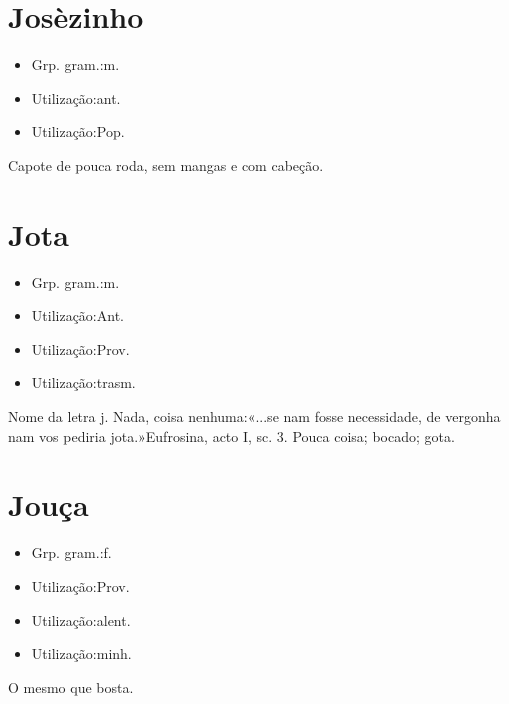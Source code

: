 \documentclass{article}
\begin{document}
\section{Josèzinho}
\begin{itemize}
\item {Grp. gram.:m.}
\end{itemize}
\begin{itemize}
\item {Utilização:ant.}
\end{itemize}
\begin{itemize}
\item {Utilização:Pop.}
\end{itemize}
Capote de pouca roda, sem mangas e com cabeção.
\section{Jota}
\begin{itemize}
\item {Grp. gram.:m.}
\end{itemize}
\begin{itemize}
\item {Utilização:Ant.}
\end{itemize}
\begin{itemize}
\item {Utilização:Prov.}
\end{itemize}
\begin{itemize}
\item {Utilização:trasm.}
\end{itemize}
Nome da letra \textunderscore j\textunderscore .
Nada, coisa nenhuma:«\textunderscore ...se nam fosse necessidade, de vergonha nam vos pediria jota.\textunderscore »\textunderscore Eufrosina\textunderscore , acto I, sc. 3.
Pouca coisa; bocado; gota.
\section{Jouça}
\begin{itemize}
\item {Grp. gram.:f.}
\end{itemize}
\begin{itemize}
\item {Utilização:Prov.}
\end{itemize}
\begin{itemize}
\item {Utilização:alent.}
\end{itemize}
\begin{itemize}
\item {Utilização:minh.}
\end{itemize}
O mesmo que \textunderscore bosta\textunderscore .
\end{document}
